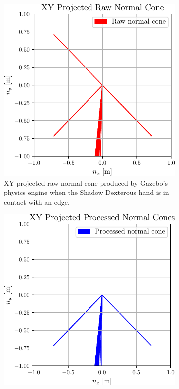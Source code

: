 \begin{figure}[!h]
	\centering
	\begin{subfigure}[b]{0.48\textwidth}
		\centering
		\includegraphics[width=\textwidth]{chapters/1-tactile-perception/fig/matplotlib/xy-projected-raw-normal-cones.pdf}
		\caption{XY projected raw normal cone produced by Gazebo's physics engine when the Shadow Dexterous hand is in contact with an edge.\newline}
		\label{fig:xy-projected-raw-normal-cones}
	\end{subfigure}
	\hfill
	\begin{subfigure}[b]{0.48\textwidth}
		\centering
		\includegraphics[width=\textwidth]{chapters/1-tactile-perception/fig/matplotlib/xy-projected-processed-normal-cones.pdf}

\end{subfigure}
\end{figure}
